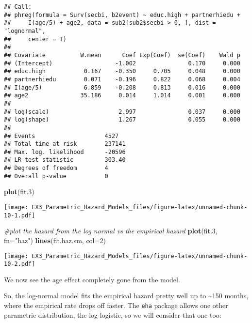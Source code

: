 \documentclass[
]{article}
\newenvironment{Shaded}{\begin{snugshade}}{\end{snugshade}}
\newcommand{\CommentTok}[1]{\textcolor[rgb]{0.56,0.35,0.01}{\textit{#1}}}
\newcommand{\DataTypeTok}[1]{\textcolor[rgb]{0.13,0.29,0.53}{#1}}
\newcommand{\DecValTok}[1]{\textcolor[rgb]{0.00,0.00,0.81}{#1}}
\newcommand{\FloatTok}[1]{\textcolor[rgb]{0.00,0.00,0.81}{#1}}
\newcommand{\KeywordTok}[1]{\textcolor[rgb]{0.13,0.29,0.53}{\textbf{#1}}}
\newcommand{\NormalTok}[1]{#1}
\newcommand{\StringTok}[1]{\textcolor[rgb]{0.31,0.60,0.02}{#1}}
\begin{document}
\begin{verbatim}
## Call:
## phreg(formula = Surv(secbi, b2event) ~ educ.high + partnerhiedu + 
##     I(age/5) + age2, data = sub2[sub2$secbi > 0, ], dist = "lognormal", 
##     center = T)
## 
## Covariate          W.mean      Coef Exp(Coef)  se(Coef)    Wald p
## (Intercept)                  -1.002               0.170     0.000 
## educ.high           0.167    -0.350     0.705     0.048     0.000 
## partnerhiedu        0.071    -0.196     0.822     0.068     0.004 
## I(age/5)            6.859    -0.208     0.813     0.016     0.000 
## age2               35.186     0.014     1.014     0.001     0.000 
## 
## log(scale)                    2.997               0.037     0.000 
## log(shape)                    1.267               0.055     0.000 
## 
## Events                    4527 
## Total time at risk        237141 
## Max. log. likelihood      -20596 
## LR test statistic         303.40 
## Degrees of freedom        4 
## Overall p-value           0
\end{verbatim}

\begin{Shaded}
\begin{Highlighting}[]
\KeywordTok{plot}\NormalTok{(fit}\FloatTok{.3}\NormalTok{)}
\end{Highlighting}
\end{Shaded}

\texttt{[image: EX3\_Parametric\_Hazard\_Models\_files/figure-latex/unnamed-chunk-10-1.pdf]}

\begin{Shaded}
\begin{Highlighting}[]
\CommentTok{#plot the hazard from the log normal vs the empirical hazard}
\KeywordTok{plot}\NormalTok{(fit}\FloatTok{.3}\NormalTok{, }\DataTypeTok{fn=}\StringTok{"haz"}\NormalTok{)}
\KeywordTok{lines}\NormalTok{(fit.haz.sm, }\DataTypeTok{col=}\DecValTok{2}\NormalTok{)}
\end{Highlighting}
\end{Shaded}

\texttt{[image: EX3\_Parametric\_Hazard\_Models\_files/figure-latex/unnamed-chunk-10-2.pdf]}

We now see the age effect completely gone from the model.

So, the log-normal model fits the empirical hazard pretty well up to
\textasciitilde150 months, where the empirical rate drops off faster.
The \texttt{eha} package allows one other parametric distribution, the
log-logistic, so we will consider that one too:
\end{document}

